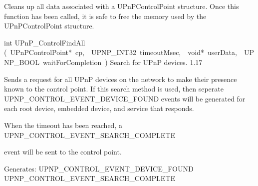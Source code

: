 \documentclass{article}
\begin{document}
\begin{cxxentry}
\begin{cxxfunction}
\begin{cxxdoc}
Cleans up all data associated with a UPnPControlPoint structure.
Once this function has been called, it is safe to free the memory used
by the UPnPControlPoint structure.


\end{cxxdoc}
\end{cxxfunction}
\begin{cxxfunction}
{int}
        {UPnP\_ControlFindAll}
        {(\ UPnPControlPoint*\ cp,\ \ UPNP\_INT32\ timeoutMsec,\ \ void*\ userData,\ \ UPNP\_BOOL\ waitForCompletion\ )}
        {Search for UPnP devices. }
        {1.17}
\begin{cxxdoc}

Sends a request for all UPnP devices on the network to make their
presence known to the control point.  If this search method is
used, then seperate UPNP\_CONTROL\_EVENT\_DEVICE\_FOUND events will be
generated for each root device, embedded device, and service that
responds.

When the timeout has been reached, a UPNP\_CONTROL\_EVENT\_SEARCH\_COMPLETE

event will be sent to the control point.

Generates:
UPNP\_CONTROL\_EVENT\_DEVICE\_FOUND
UPNP\_CONTROL\_EVENT\_SEARCH\_COMPLETE



\end{cxxdoc}
\end{cxxfunction}
\end{cxxentry}
\end{document}
